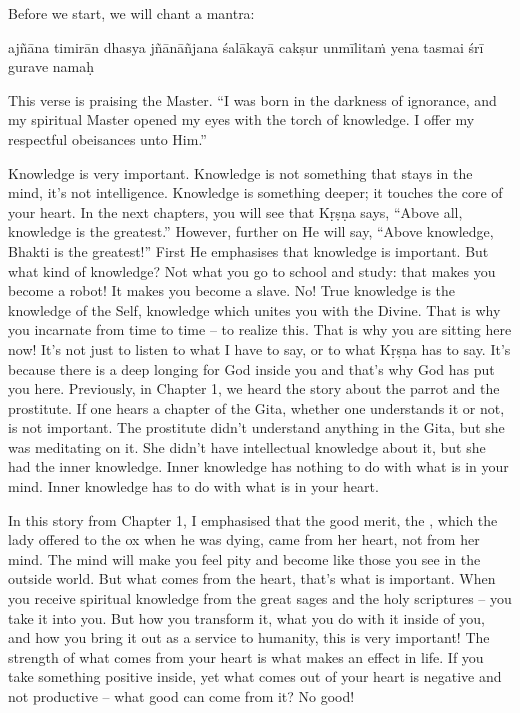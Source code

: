 Before we start, we will chant a mantra:

ajñāna timirān dhasya jñānāñjana śalākayā cakṣur unmīlitaṁ yena tasmai śrī gurave namaḥ

This verse is praising the Master. “I was born in the darkness of ignorance, and my spiritual Master opened my eyes with the torch of knowledge. I offer my respectful obeisances unto Him.”

Knowledge is very important. Knowledge is not something that stays in the mind, it’s not intelligence. Knowledge is something deeper; it touches the core of your heart. In the next chapters, you will see that Kṛṣṇa says, “Above all, knowledge is the greatest.” However, further on He will say, “Above knowledge, Bhakti is the greatest!” First He emphasises that knowledge is important. But what kind of knowledge? Not what you go to school and study: that makes you become a robot! It makes you become a slave. No! True knowledge is the knowledge of the Self, knowledge which unites you with the Divine. That is why you incarnate from time to time – to realize this. That is why you are sitting here now! It’s not just to listen to what I have to say, or to what Kṛṣṇa has to say. It’s because there is a deep longing for God inside you and that’s why God has put you here. Previously, in Chapter 1, we heard the story about the parrot and the prostitute. If one hears a chapter of the Gita, whether one understands it or not, is not important. The prostitute didn’t understand anything in the Gita, but she was meditating on it. She didn’t have intellectual knowledge about it, but she had the inner knowledge. Inner knowledge has nothing to do with what is in your mind. Inner knowledge has to do with what is in your heart.

In this story from Chapter 1, I emphasised that the good merit, the , which the lady offered to the ox when he was dying, came from her heart, not from her mind. The mind will make you feel pity and become like those you see in the outside world. But what comes from the heart, that’s what is important. When you receive spiritual knowledge from the great sages and the holy scriptures – you take it into you. But how you transform it, what you do with it inside of you, and how you bring it out as a service to humanity, this is very important!  The strength of what comes from your heart is what makes an effect in life. If you take something positive inside, yet what comes out of your heart is negative and not productive – what good can come from it? No good!

